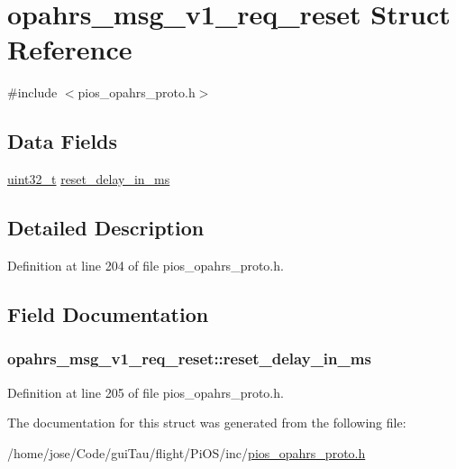 \hypertarget{structopahrs__msg__v1__req__reset}{\section{opahrs\-\_\-msg\-\_\-v1\-\_\-req\-\_\-reset Struct Reference}
\label{structopahrs__msg__v1__req__reset}
}


{\ttfamily \#include $<$pios\-\_\-opahrs\-\_\-proto.\-h$>$}

\subsection*{Data Fields}
\begin{DoxyCompactItemize}
\item 
\hyperlink{stdint_8h_a435d1572bf3f880d55459d9805097f62}{uint32\-\_\-t} \hyperlink{structopahrs__msg__v1__req__reset_a1da02a980757354d9282a44176183203}{reset\-\_\-delay\-\_\-in\-\_\-ms}
\end{DoxyCompactItemize}


\subsection{Detailed Description}


Definition at line 204 of file pios\-\_\-opahrs\-\_\-proto.\-h.



\subsection{Field Documentation}
\hypertarget{structopahrs__msg__v1__req__reset_a1da02a980757354d9282a44176183203}{
\subsubsection[{reset\-\_\-delay\-\_\-in\-\_\-ms}]{ opahrs\-\_\-msg\-\_\-v1\-\_\-req\-\_\-reset\-::reset\-\_\-delay\-\_\-in\-\_\-ms}}\label{structopahrs__msg__v1__req__reset_a1da02a980757354d9282a44176183203}


Definition at line 205 of file pios\-\_\-opahrs\-\_\-proto.\-h.



The documentation for this struct was generated from the following file\-:\begin{DoxyCompactItemize}
\item 
/home/jose/\-Code/gui\-Tau/flight/\-Pi\-O\-S/inc/\hyperlink{pios__opahrs__proto_8h}{pios\-\_\-opahrs\-\_\-proto.\-h}\end{DoxyCompactItemize}
